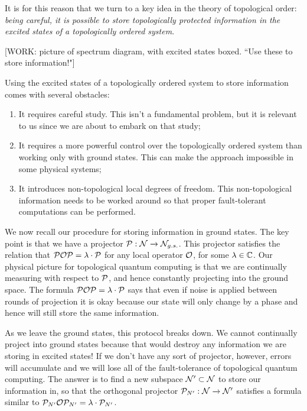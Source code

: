 It is for this reason that we turn to a key idea in the theory of topological order: \textit{being careful, it is possible to store topologically protected information in the excited states of a topologically ordered system}.

[WORK: picture of spectrum diagram, with excited states boxed. ``Use these to store information!"]

Using the excited states of a topologically ordered system to store information comes with several obstacles:

\begin{enumerate}
\item It requires careful study. This isn't a fundamental problem, but it is relevant to us since we are about to embark on that study;
\item It requires a more powerful control over the topologically ordered system than working only with ground states. This can make the approach impossible in some physical systems;
\item It introduces non-topological local degrees of freedom. This non-topological information needs to be worked around so that proper fault-tolerant computations can be performed.
\end{enumerate}

We now recall our procedure for storing information in ground states. The key point is that we have a projector $\mathcal{P}:\mathcal{N}\xrightarrow{}\mathcal{N}_{g.s.}$. This projector satisfies the relation that $\mathcal{P} \mathcal{O} \mathcal{P} = \lambda\cdot \mathcal{P}$ for any local operator $\mathcal{O}$, for some $\lambda\in \mathbb{C}$. Our physical picture for topological quantum computing is that we are continually measuring with respect to $\mathcal{P}$, and hence constantly projecting into the ground space. The formula $\mathcal{P} \mathcal{O} \mathcal{P} = \lambda \cdot \mathcal{P}$ says that even if noise is applied between rounds of projection it is okay because our state will only change by a phase and hence will still store the same information.

As we leave the ground states, this protocol breaks down. We cannot continually project into ground states because that would destroy any information we are storing in excited states! If we don't have any sort of projector, however, errors will accumulate and we will lose all of the fault-tolerance of topological quantum computing. The answer is to find a new subspace $\mathcal{N}' \subset \mathcal{N}$ to store our information in, so that the orthogonal projector $\mathcal{P}_{N'}: \mathcal{N} \xrightarrow{} \mathcal{N}'$ satisfies a formula similar to $\mathcal{P}_{N'}\mathcal{O} \mathcal{P}_{N'}=\lambda\cdot \mathcal{P}_{N'}$.

